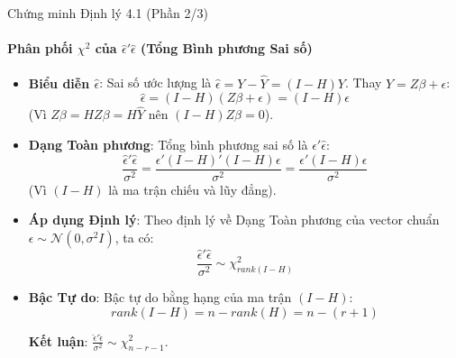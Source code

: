 \begin{frame}{Chứng minh Định lý 4.1 (Phần 2/3)}
    \framesubtitle{Phân phối $\chi^2$ của $\hat{\epsilon}'\hat{\epsilon}$ (Tổng Bình phương Sai số)}

    \begin{itemize}
        \item \textbf{Biểu diễn $\hat{\epsilon}$}: Sai số ước lượng là $\hat{\epsilon} = Y - \hat{Y} = (I - H)Y$.
        Thay $Y = Z\beta + \epsilon$:
        \[
            \hat{\epsilon} = (I - H)(Z\beta + \epsilon) = (I - H)\epsilon
        \]
        (Vì $Z\beta = HZ\beta = H\hat{Y}$ nên $(I-H)Z\beta = 0$).
        \item \textbf{Dạng Toàn phương}: Tổng bình phương sai số là $\hat{\epsilon}'\hat{\epsilon}$:
        \[
            \frac{\hat{\epsilon}'\hat{\epsilon}}{\sigma^2} = \frac{\epsilon'(I - H)'(I - H)\epsilon}{\sigma^2} = \frac{\epsilon'(I - H)\epsilon}{\sigma^2}
        \]
        (Vì $(I-H)$ là ma trận chiếu và lũy đẳng).
        \item \textbf{Áp dụng Định lý}: Theo định lý về Dạng Toàn phương của vector chuẩn $\epsilon \sim \mathcal{N}(0, \sigma^2 I)$, ta có:
        \[
            \frac{\hat{\epsilon}'\hat{\epsilon}}{\sigma^2} \sim \chi^2_{rank(I-H)}
        \]

        \item \textbf{Bậc Tự do}: Bậc tự do bằng hạng của ma trận $(I-H)$:
        \[
            rank(I-H) = n - rank(H) = n - (r+1)
        \]
        
        \textbf{Kết luận}: $\frac{\hat{\epsilon}'\hat{\epsilon}}{\sigma^2} \sim \chi^2_{n-r-1}$.
    \end{itemize}
\end{frame}
